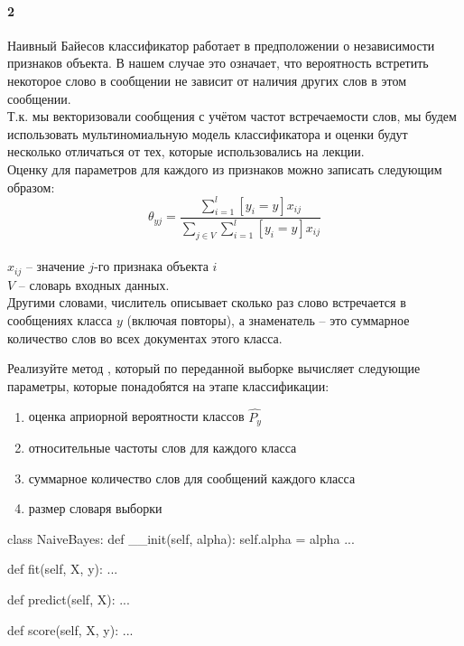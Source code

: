 \documentclass[a4paper,12pt]{article}
\begin{document}
\paragraph{2} Наивный Байесов классификатор работает в предположении о независимости признаков объекта. В нашем случае это означает, что вероятность встретить некоторое слово в сообщении не зависит от наличия других слов в этом сообщении.  \\
Т.к. мы векторизовали сообщения с учётом частот встречаемости слов, мы будем использовать мультиномиальную модель классификатора и  оценки будут несколько отличаться от тех, которые использовались на лекции. \\
\clearpage
Оценку для параметров для каждого из признаков можно записать следующим образом:\\
$$\theta_{yj} = \frac{\sum\limits_{i=1}^l [y_i = y] x_{ij}}{\sum\limits_{j \in V}\sum\limits_{i=1}^l [y_i = y] x_{ij}}$$\\
$x_{ij}$ -- значение $j$-го признака объекта $i$\\
$V$ -- словарь входных данных.\\

Другими словами, числитель описывает сколько раз слово встречается в сообщениях класса $y$ (включая повторы), а знаменатель – это суммарное количество слов во всех документах этого класса.

Реализуйте метод , который по переданной выборке вычисляет следующие параметры, которые понадобятся на этапе классификации:
\begin{enumerate}
  \item оценка априорной вероятности классов $\hat{P_y}$
  \item относительные частоты слов для каждого класса
  \item суммарное количество слов для сообщений каждого класса
  \item размер словаря выборки
\end{enumerate}
\bigbreak
\begin{python3}
class NaiveBayes:
    def __init(self, alpha):
        self.alpha = alpha
        ... 
        
    def fit(self, X, y):        
        ...
      
    def predict(self, X):
        ...    
        
    def score(self, X, y):
        ... 
        
\end{python3}
\end{document}
